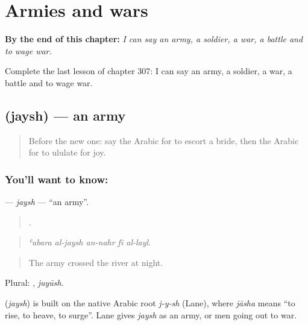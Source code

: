 
\chapter{Armies and wars}
\label{ch:ar-armies-and-wars}

\begin{chapteropening}
\textbf{By the end of this chapter:} \emph{I can say an army, a soldier, a war, a battle and to wage war.}

Complete the last lesson of chapter 307: I can say an army, a soldier, a war, a battle and to wage war.
\end{chapteropening}

\section[\texorpdfstring{\ar{جيش} (jaysh)}{جيش (jaysh)}]{ (jaysh) — an army}

\label{lesson:AR-C307-jaysh}



\begin{quote}
Before the new one: say the Arabic for to escort a bride, then the Arabic for to ululate for joy.
\end{quote}

\subsection*{You'll want to know: }
\textbf{} — \emph{jaysh} — \textquotedblleft{}an army\textquotedblright{}.

\begin{quote}
    .
\end{quote}

\begin{quote}
\emph{ʿabara al-jaysh an-nahr fī al-layl.}
\end{quote}

\begin{quote}
The army crossed the river at night.
\end{quote}

Plural: , \emph{juyūsh}.

\begin{cousinweb}
\textbf{} (\emph{jaysh}) is built on the native Arabic root \emph{j-y-sh} (Lane), where \emph{jāsha} means \textquotedblleft{}to rise, to heave, to surge\textquotedblright{}. Lane gives \emph{jaysh} as an army, or men going out to war.
\end{cousinweb}

